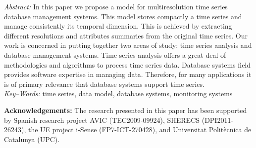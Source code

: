 \documentclass[twocolumn,11pt,a4paper]{article}
\begin{document}
{\begin{minipage}[b]{6.9in}
\baselineskip 12.5pt {\it Abstract:}
In this paper we propose a model for multiresolution time series
database management systems. This model stores compactly a time series
and manage consistently its temporal dimension. This is achieved by
extracting different resolutions and attributes summaries from the
original time series.
%
Our work is concerned in putting together two areas of study: time
series analysis and database management systems. Time series analysis
offers a great deal of methodologies and algorithms to process time
series data. Database systems field provides software expertise in
managing data. Therefore, for many applications it is of primary
relevance that database systems support time series.
%
\\ [4mm] {\it Key--Words:}
time series, data model, database systems, monitoring systems
\end{minipage}
\vspace{-10pt}}

\maketitle

\thispagestyle{empty} \pagestyle{empty}
%
%















\vspace{10pt} \noindent \textbf{Acknowledgements:} The research
presented in this paper has been supported by Spanish research project
AVIC ({\small TEC2009-09924}), SHERECS ({\small DPI2011-26243}), the
UE project i-Sense ({\small FP7-ICT-270428}), and Universitat
Polit\`{e}cnica de Catalunya (UPC).


\printbibliography{}
\end{document}
